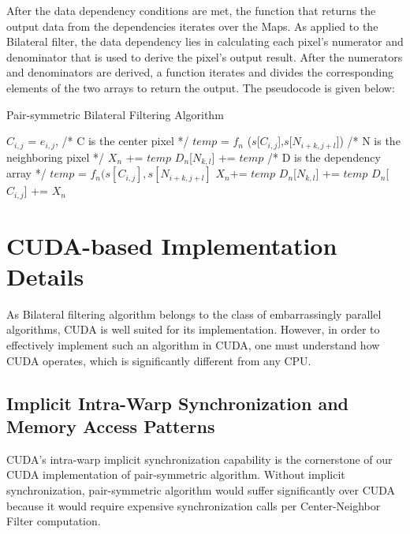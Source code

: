 \documentclass{IEEEtran}
\begin{document}
After the data dependency conditions are met, the function that returns the output data from the dependencies iterates over the Maps. As applied to the Bilateral filter, the data dependency lies in calculating each pixel's numerator and denominator that is used to derive the pixel's output result. After the numerators and denominators are derived, a function iterates and divides the corresponding elements of the two arrays to return the output. The pseudocode is given below: 

\begin{algorithm}[h]
\caption{\label{alg:Example-Algorithm-float-1}Pair-symmetric Bilateral Filtering Algorithm}
\begin{algorithmic}
\STATE $C_{i,j}$ = $e_{i,j}$, /* C is the center pixel */
\STATE $temp$ = $f_n$ ($s$[$C_{i,j}$],$s$[$N_{i+k,j+l}$])
\STATE /* N is the neighboring pixel */
\STATE $X_n$ += $temp$
\STATE $D_n$[$N_{k,l}$] += $temp$
\STATE /* D is the dependency array */
\STATE $temp$ = $f_n(s[C_{i,j}],s[N_{i+k,j+l}]$
\STATE $X_n$+= $temp$
\STATE $D_n$[$N_{k,l}$] += $temp$
\STATE $D_n$[$C_{i,j}$] += $X_n$
\ENDFOR
\ENDFOR
\ENDFOR
\ENDFOR
\ENDFOR
\ENDFOR
\ENDFOR
\end{algorithmic}
\end{algorithm}

\section{CUDA-based Implementation Details}
\label{sec:GPUoptimizations} 
As Bilateral filtering algorithm belongs to the class of embarrassingly parallel algorithms, CUDA is well suited for its implementation. However,
in order to effectively implement such an algorithm in CUDA, one must understand how CUDA operates, which is significantly different from any CPU.

\subsection{Implicit Intra-Warp Synchronization and Memory Access Patterns}


CUDA's intra-warp implicit synchronization capability is the cornerstone of our CUDA implementation of pair-symmetric algorithm. Without implicit synchronization, pair-symmetric algorithm would suffer significantly over CUDA because it would require expensive synchronization calls per Center-Neighbor Filter computation.
\end{document}

